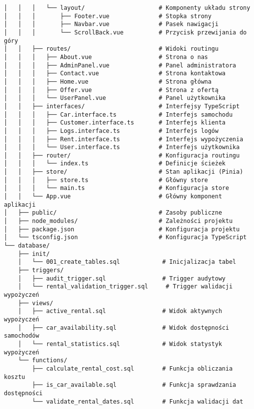 \documentclass[12pt]{article}
\begin{document}
\begin{verbatim}
│   │   │   └── layout/                     # Komponenty układu strony
│   │   │       ├── Footer.vue              # Stopka strony
│   │   │       ├── Navbar.vue              # Pasek nawigacji
│   │   │       └── ScrollBack.vue          # Przycisk przewijania do góry
│   │   ├── routes/                         # Widoki routingu
│   │   │   ├── About.vue                   # Strona o nas
│   │   │   ├── AdminPanel.vue              # Panel administratora
│   │   │   ├── Contact.vue                 # Strona kontaktowa
│   │   │   ├── Home.vue                    # Strona główna
│   │   │   ├── Offer.vue                   # Strona z ofertą
│   │   │   └── UserPanel.vue               # Panel użytkownika
│   │   ├── interfaces/                     # Interfejsy TypeScript
│   │   │   ├── Car.interface.ts            # Interfejs samochodu
│   │   │   ├── Customer.interface.ts       # Interfejs klienta
│   │   │   ├── Logs.interface.ts           # Interfejs logów
│   │   │   ├── Rent.interface.ts           # Interfejs wypożyczenia
│   │   │   └── User.interface.ts           # Interfejs użytkownika
│   │   ├── router/                         # Konfiguracja routingu
│   │   │   └── index.ts                    # Definicje ścieżek
│   │   ├── store/                          # Stan aplikacji (Pinia)
│   │   │   ├── store.ts                    # Główny store
│   │   │   └── main.ts                     # Konfiguracja store
│   │   └── App.vue                         # Główny komponent aplikacji
│   ├── public/                             # Zasoby publiczne
│   ├── node_modules/                       # Zależności projektu
│   ├── package.json                        # Konfiguracja projektu
│   └── tsconfig.json                       # Konfiguracja TypeScript
└── database/
    ├── init/
    │   └── 001_create_tables.sql            # Inicjalizacja tabel
    ├── triggers/
    │   ├── audit_trigger.sql                # Trigger audytowy
    │   └── rental_validation_trigger.sql     # Trigger walidacji wypożyczeń
    ├── views/
    │   ├── active_rental.sql                # Widok aktywnych wypożyczeń
    │   ├── car_availability.sql             # Widok dostępności samochodów
    │   └── rental_statistics.sql            # Widok statystyk wypożyczeń
    └── functions/
        ├── calculate_rental_cost.sql        # Funkcja obliczania kosztu
        ├── is_car_available.sql             # Funkcja sprawdzania dostępności
        └── validate_rental_dates.sql        # Funkcja walidacji dat
\end{verbatim}
\end{document}
